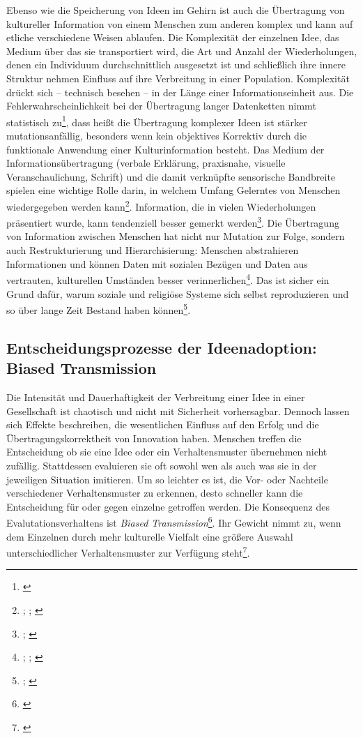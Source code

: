\documentclass[openany,twoside,twocolumn]{book}
\let\rmarkdownfootnote\footnote%
\def\footnote{\protect\rmarkdownfootnote}
\begin{document}
Ebenso wie die Speicherung von Ideen im Gehirn ist auch die Übertragung
von kultureller Information von einem Menschen zum anderen komplex und
kann auf etliche verschiedene Weisen ablaufen. Die Komplexität der
einzelnen Idee, das Medium über das sie transportiert wird, die Art und
Anzahl der Wiederholungen, denen ein Individuum durchschnittlich
ausgesetzt ist und schließlich ihre innere Struktur nehmen Einfluss auf
ihre Verbreitung in einer Population. Komplexität drückt sich --
technisch besehen -- in der Länge einer Informationseinheit aus. Die
Fehlerwahrscheinlichkeit bei der Übertragung langer Datenketten nimmt
statistisch zu\footnote{\textcite{eerkens_cultural_2007}}, dass heißt
die Übertragung komplexer Ideen ist stärker mutationsanfällig, besonders
wenn kein objektives Korrektiv durch die funktionale Anwendung einer
Kulturinformation besteht. Das Medium der Informationsübertragung
(verbale Erklärung, praxisnahe, visuelle Veranschaulichung, Schrift) und
die damit verknüpfte sensorische Bandbreite spielen eine wichtige Rolle
darin, in welchem Umfang Gelerntes von Menschen wiedergegeben werden
kann\footnote{\textcite{eerkens_cultural_2005};
  \textcite{eerkens_practice_2000}; \textcite{eerkens_techniques_2001}}.
Information, die in vielen Wiederholungen präsentiert wurde, kann
tendenziell besser gemerkt werden\footnote{\textcite{cover_elements_2012};
  \textcite{shannon_mathematical_1949}}. Die Übertragung von Information
zwischen Menschen hat nicht nur Mutation zur Folge, sondern auch
Restrukturierung und Hierarchisierung: Menschen abstrahieren
Informationen und können Daten mit sozialen Bezügen und Daten aus
vertrauten, kulturellen Umständen besser verinnerlichen\footnote{\textcite{mesoudi_hierarchical_2004};
  \textcite{mesoudi_bias_2006}; \textcite{washburn_remembering_2001}}.
Das ist sicher ein Grund dafür, warum soziale und religiöse Systeme sich
selbst reproduzieren und so über lange Zeit Bestand haben
können\footnote{\textcite{kuijt_people_2000};
  \textcite{kuijt_place_2001}}.

\hypertarget{biased-transmission}{%
\subsection{Entscheidungsprozesse der Ideenadoption: Biased
Transmission}\label{biased-transmission}}

Die Intensität und Dauerhaftigkeit der Verbreitung einer Idee in einer
Gesellschaft ist chaotisch und nicht mit Sicherheit vorhersagbar.
Dennoch lassen sich Effekte beschreiben, die wesentlichen Einfluss auf
den Erfolg und die Übertragungskorrektheit von Innovation haben.
Menschen treffen die Entscheidung ob sie eine Idee oder ein
Verhaltensmuster übernehmen nicht zufällig. Stattdessen evaluieren sie
oft sowohl wen als auch was sie in der jeweiligen Situation imitieren.
Um so leichter es ist, die Vor- oder Nachteile verschiedener
Verhaltensmuster zu erkennen, desto schneller kann die Entscheidung für
oder gegen einzelne getroffen werden. Die Konsequenz des
Evalutationsverhaltens ist \emph{Biased Transmission}\footnote{\textcite{henrich_cultural_2001}}.
Ihr Gewicht nimmt zu, wenn dem Einzelnen durch mehr kulturelle Vielfalt
eine größere Auswahl unterschiedlicher Verhaltensmuster zur Verfügung
steht\footnote{\textcite{smith_cultural_1992}}.
\end{document}
